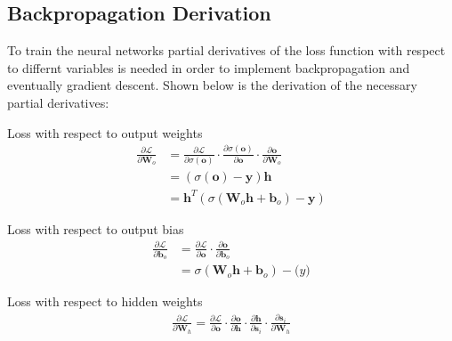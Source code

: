 \documentclass[12pt]{article}
\begin{document}
\subsection{Backpropagation Derivation}
To train the neural networks partial derivatives of the loss function with respect to differnt
variables is needed in order to implement backpropagation and eventually gradient descent.
Shown below is the derivation of the necessary partial derivatives:
\begin{description}
  \item{Loss with respect to output weights}
        \begin{equation}
          \begin{aligned}
            \frac{\partial \mathcal{L}}{\partial \mathbf{W}_o} & = \frac{\partial \mathcal{L}}{\partial \sigma (\mathbf{o})} \cdot \frac{\partial \sigma(\mathbf{o})}{\partial \mathbf{o}} \cdot \frac{\partial \mathbf{o}}{\partial \mathbf{W}_o} \\
                                                               & = (\sigma (\mathbf{o}) - \mathbf{y}) \mathbf{h}                                                                                                                                   \\
                                                               & = \mathbf{h}^T (\sigma (\mathbf{W}_{o} \mathbf{h} + \mathbf{b}_o) - \mathbf{y})
          \end{aligned}
        \end{equation}
  \item{Loss with respect to output bias}
        \begin{equation}
          \begin{aligned}
            \frac{\partial \mathcal{L}}{\partial \mathbf{b}_o} & = \frac{\partial \mathcal{L}}{\partial \mathbf{o}} \cdot \frac{\partial\mathbf{o}}{\partial \mathbf{b}_o} \\
                                                               & = \sigma (\mathbf{W}_{o} \mathbf{h} + \mathbf{b}_o) - \mathbf(y)
          \end{aligned}
        \end{equation}
  \item{Loss with respect to hidden weights}
        \begin{equation}
          \begin{aligned}
            \frac{\partial \mathcal{L}}{\partial \mathbf{W}_h} = \frac{\partial \mathcal{L}}{\partial \mathbf{o}} \cdot \frac{\partial \mathbf{o}}{\partial \mathbf{h}} \cdot \frac{\partial \mathbf{h}}{\partial \mathbf{s}_i} \cdot \frac{\partial \mathbf{s}_i}{\partial \mathbf{W}_h} \\

\end{aligned}
\end{equation}
\end{description}
\end{document}
